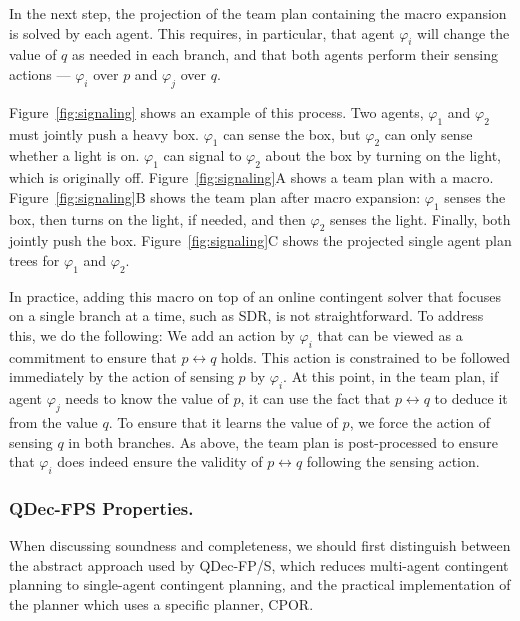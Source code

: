 \documentclass[letterpaper]{article}
\theoremstyle{definition}
\begin{document}
In the next step, the projection of the team plan containing the macro expansion is solved by each agent. This requires, in particular, that agent $\varphi_i$ will change the value of $q$ as needed in each branch, and that both agents perform their sensing actions --- $\varphi_i$ over $p$ and $\varphi_j$ over $q$.

Figure~\ref{fig:signaling} shows an example of this process. Two agents, $\varphi_1$ and $\varphi_2$ must jointly push a heavy box. $\varphi_1$ can sense the box, but $\varphi_2$ can only sense whether a light is on. $\varphi_1$ can  signal to $\varphi_2$ about the box by turning on the light, which is originally off. Figure~\ref{fig:signaling}A shows a team plan with a macro.
Figure~\ref{fig:signaling}B shows the team plan after macro expansion: $\varphi_1$ senses the box, then turns on the light, if needed, and then $\varphi_2$ senses the light. Finally, both jointly push the box.
Figure~\ref{fig:signaling}C shows the projected single agent plan trees for $\varphi_1$ and $\varphi_2$.  %



In practice, adding this macro on top of an online contingent solver that focuses on a single branch at a time, such as SDR, is not straightforward. To address this, we do the following:
We add an action by $\varphi_i$ that can be viewed as a commitment to ensure that $p\leftrightarrow q$ holds. This action is constrained to be followed immediately by the action of sensing $p$ by $\varphi_i$.
At this point, in the team plan, if agent $\varphi_j$ needs to know the value of $p$, it can use the fact that $p\leftrightarrow q$ to deduce it from the value $q$. To ensure that it learns the value of $p$, we force the action of sensing $q$ in both branches.
As above, the team plan is post-processed to ensure that $\varphi_i$ does indeed ensure the validity of $p\leftrightarrow q$ following the sensing action.






\subsubsection{QDec-FPS Properties.}
When discussing soundness and completeness, we should first
distinguish between the abstract approach used by QDec-FP/S, which reduces multi-agent contingent planning to single-agent contingent planning, and the practical implementation of the planner which uses a specific planner, CPOR.
\end{document}

